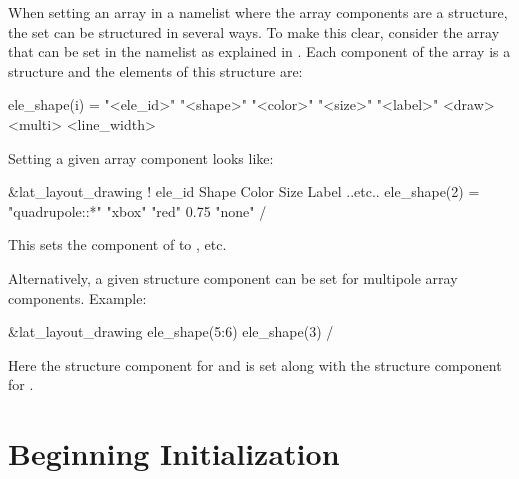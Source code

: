 When setting an array in a namelist where the array components are a structure, the set can be
structured in several ways. To make this clear, consider the  array that can be set
in the  namelist as explained in . Each component
of the  array is a structure and the elements of this structure are:
\begin{example}
  ele_shape(i) = "<ele_id>" "<shape>" "<color>" "<size>" "<label>" <draw> <multi> <line_width>
\end{example}
Setting a given  array component looks like:
\begin{example}
  &lat_layout_drawing
    !               ele_id                  Shape      Color     Size  Label  ..etc..
    ele_shape(2) = "quadrupole::*"          "xbox"     "red"     0.75  "none" 
  /
\end{example}
This sets the  component of  to , etc.

Alternatively, a given structure component can be set for multipole array components. Example:
\begin{example}
  &lat_layout_drawing
    ele_shape(5:6)%
    ele_shape(3)%
  /
\end{example}
Here the  structure component for  and  is set along
with the  structure component for .

\section{Beginning Initialization}
\label{s:init.global} 

